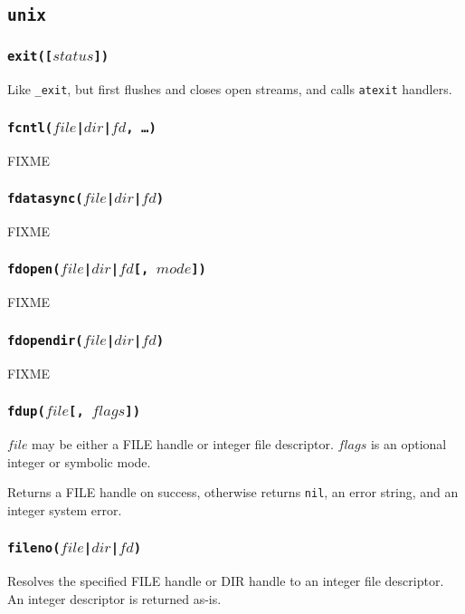 \documentclass[11pt, oneside]{memoir}
\newcommand*{\nil}[0]{\texttt{nil}\xspace}
\newcommand*{\syscall}[1]{\texttt{#1}\xspace}
\newcommand*{\fn}[1]{\texttt{#1}\xspace}
\newcounter{toccols}
\newenvironment{Module}[1]{
	\subsection{\texttt{#1}}
	\addtocontents{toc}{
		\protect\begin{multicols}{\value{toccols}}
	}
}{
	\addtocontents{toc}{\protect\end{multicols}}
}
\begin{document}
\begin{Module}{unix}
\subsubsection[\fn{exit}]{\fn{exit([$status$])}}

Like \fn{\_exit}, but first flushes and closes open streams, and calls \syscall{atexit} handlers.

\subsubsection[\fn{fcntl}]{\fn{fcntl($file$|$dir$|$fd$, \ldots)}}

FIXME

\subsubsection[\fn{fdatasync}]{\fn{fdatasync($file$|$dir$|$fd$)}}

FIXME

\subsubsection[\fn{fdopen}]{\fn{fdopen($file$|$dir$|$fd$[, $mode$])}}

FIXME

\subsubsection[\fn{fdopendir}]{\fn{fdopendir($file$|$dir$|$fd$)}}

FIXME

\subsubsection[\fn{fdup}]{\fn{fdup($file$[, $flags$])}}

$file$ may be either a FILE handle or integer file descriptor. $flags$ is an optional integer or symbolic mode.

Returns a FILE handle on success, otherwise returns \nil, an error string, and an integer system error.

\subsubsection[\fn{fileno}]{\fn{fileno($file$|$dir$|$fd$)}}

Resolves the specified FILE handle or DIR handle to an integer file descriptor. An integer descriptor is returned as-is.


\end{Module}
\end{document}
